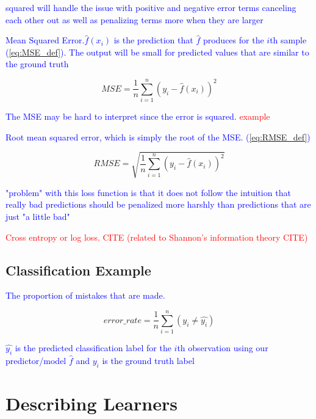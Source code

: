 \textcolor{blue}{squared will handle the issue with positive and negative error terms canceling each other out as well as penalizing terms more when they are larger}

\textcolor{blue}{Mean Squared Error.$\hat{f}(x_i)$ is the prediction that $\hat{f}$ produces for the $i$th sample (\ref{eq:MSE_def}). The output will be small for predicted values that are similar to the ground truth}

\begin{equation}
{MSE = \frac{1}{n}\sum_{i=1}^{n}(y_i - \hat{f}(x_i))^2}
\label{eq:MSE_def}
\end{equation}

\textcolor{blue}{The MSE may be hard to interpret since the error is squared. \textcolor{red}{example}}

\textcolor{blue}{Root mean squared error, which is simply the root of the MSE. (\ref{eq:RMSE_def})}

\begin{equation}
{RMSE = \sqrt{\frac{1}{n}\sum_{i=1}^{n}(y_i - \hat{f}(x_i))^2}}
\label{eq:RMSE_def}
\end{equation}

\textcolor{blue}{"problem" with this loss function is that it does not follow the intuition that really bad predictions should be penalized more harshly than predictions that are just "a little bad"}

\textcolor{red}{Cross entropy or log loss. \textcolor{red}{CITE} (related to Shannon's information theory \textcolor{red}{CITE})}



\subsection{Classification Example}

\textcolor{blue}{The proportion of mistakes that are made.}

\begin{equation}
{error\_rate = \frac{1}{n}\sum_{i=1}^{n}(y_i \ne \hat{y_i})}
\label{eq:class_error_rate_def}
\end{equation}

\textcolor{blue}{$\hat{y_i}$ is the predicted classification label for the $i$th observation using our predictor/model $\hat{f}$ and $y_i$ is the ground truth label}

\section{Describing Learners}

